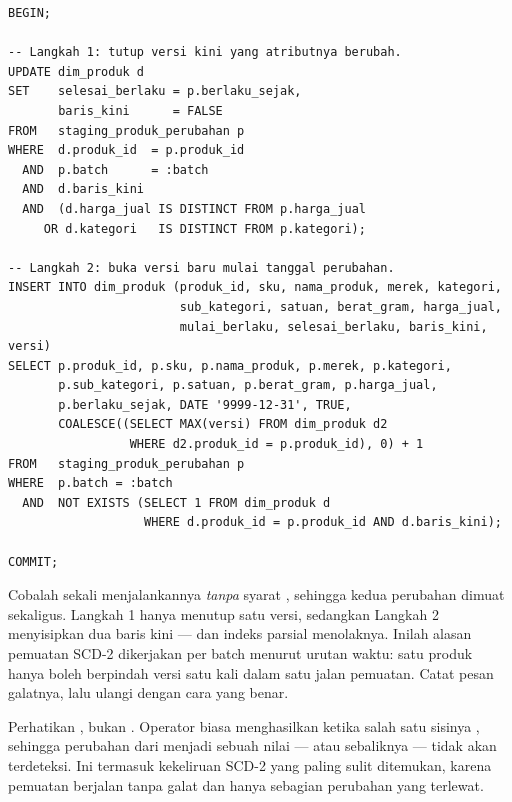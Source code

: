 \begin{lstlisting}[style=sqlgaya]
BEGIN;

-- Langkah 1: tutup versi kini yang atributnya berubah.
UPDATE dim_produk d
SET    selesai_berlaku = p.berlaku_sejak,
       baris_kini      = FALSE
FROM   staging_produk_perubahan p
WHERE  d.produk_id  = p.produk_id
  AND  p.batch      = :batch
  AND  d.baris_kini
  AND  (d.harga_jual IS DISTINCT FROM p.harga_jual
     OR d.kategori   IS DISTINCT FROM p.kategori);

-- Langkah 2: buka versi baru mulai tanggal perubahan.
INSERT INTO dim_produk (produk_id, sku, nama_produk, merek, kategori,
                        sub_kategori, satuan, berat_gram, harga_jual,
                        mulai_berlaku, selesai_berlaku, baris_kini, versi)
SELECT p.produk_id, p.sku, p.nama_produk, p.merek, p.kategori,
       p.sub_kategori, p.satuan, p.berat_gram, p.harga_jual,
       p.berlaku_sejak, DATE '9999-12-31', TRUE,
       COALESCE((SELECT MAX(versi) FROM dim_produk d2
                 WHERE d2.produk_id = p.produk_id), 0) + 1
FROM   staging_produk_perubahan p
WHERE  p.batch = :batch
  AND  NOT EXISTS (SELECT 1 FROM dim_produk d
                   WHERE d.produk_id = p.produk_id AND d.baris_kini);

COMMIT;
\end{lstlisting}

\begin{peringatan}
Cobalah sekali menjalankannya \emph{tanpa} syarat ,
sehingga kedua perubahan dimuat sekaligus. Langkah 1 hanya menutup satu versi,
sedangkan Langkah 2 menyisipkan dua baris kini --- dan indeks parsial
 menolaknya. Inilah alasan pemuatan SCD-2
dikerjakan per batch menurut urutan waktu: satu produk hanya boleh berpindah
versi satu kali dalam satu jalan pemuatan. Catat pesan galatnya, lalu ulangi
dengan cara yang benar.
\end{peringatan}

\begin{catatan}
Perhatikan , bukan \perintah{<>}. Operator biasa
menghasilkan  ketika salah satu sisinya ,
sehingga perubahan dari  menjadi sebuah nilai --- atau
sebaliknya --- tidak akan terdeteksi. Ini termasuk kekeliruan SCD-2 yang paling
sulit ditemukan, karena pemuatan berjalan tanpa galat dan hanya sebagian
perubahan yang terlewat.
\end{catatan}


